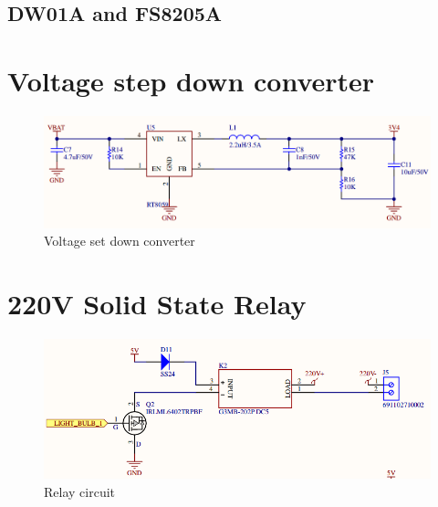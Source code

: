 \documentclass[\main/main.tex]{subfiles}
\begin{document}
\subsection{DW01A and FS8205A}

\section{Voltage step down converter}
\begin{figure}[H]
    \begin{center}
        \includegraphics[scale=0.5]{voltage_set_down_converter.png}
    \end{center}
    \caption{Voltage set down converter}
    \label{fig:voltage_set_down_converter}
\end{figure}

\section{220V Solid State Relay}
\begin{figure}[H]
    \begin{center}
        \includegraphics[scale=0.5]{relay_circuit.png}
    \end{center}
    \caption{Relay circuit}
    \label{fig:relay_circuit}
\end{figure}
\end{document}
